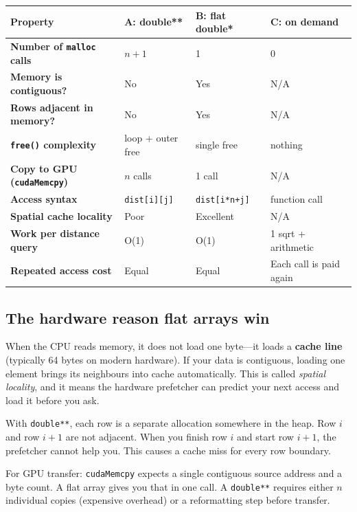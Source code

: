 \documentclass[11pt]{article}
\begin{document}
\begin{center}
\renewcommand{\arraystretch}{1.6}
\begin{tabularx}{\textwidth}{>{\bfseries}p{4.2cm} X X X}
\toprule
Property & \textbf{A: double**} & \textbf{B: flat double*} & \textbf{C: on demand} \\
\midrule
Number of \texttt{malloc} calls & $n + 1$ & 1 & 0 \\
Memory is contiguous? & No & Yes & N/A \\
Rows adjacent in memory? & No & Yes & N/A \\
\texttt{free()} complexity & loop + outer free & single free & nothing \\
Copy to GPU (\texttt{cudaMemcpy}) & $n$ calls & 1 call & N/A \\
Access syntax & \texttt{dist[i][j]} & \texttt{dist[i*n+j]} & function call \\
Spatial cache locality & Poor & Excellent & N/A \\
Work per distance query & O(1) & O(1) & 1 sqrt + arithmetic \\
Repeated access cost & Equal & Equal & Each call is paid again \\
\bottomrule
\end{tabularx}
\end{center}

\subsection{The hardware reason flat arrays win}

When the CPU reads memory, it does not load one byte---it loads a \textbf{cache line} (typically 64 bytes on modern hardware). If your data is contiguous, loading one element brings its neighbours into cache automatically. This is called \emph{spatial locality}, and it means the hardware prefetcher can predict your next access and load it before you ask.

With \texttt{double**}, each row is a separate allocation somewhere in the heap. Row $i$ and row $i+1$ are not adjacent. When you finish row $i$ and start row $i+1$, the prefetcher cannot help you. This causes a cache miss for every row boundary.

For GPU transfer: \texttt{cudaMemcpy} expects a single contiguous source address and a byte count. A flat array gives you that in one call. A \texttt{double**} requires either $n$ individual copies (expensive overhead) or a reformatting step before transfer.
\end{document}
